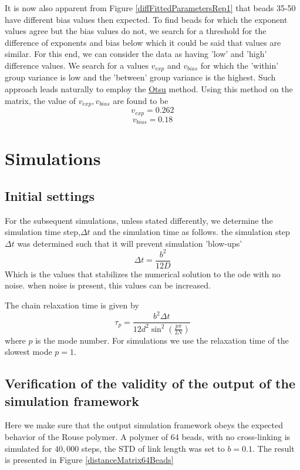 \documentclass[12pt]{paper}
\begin{document}
It is now also apparent from Figure \ref{diffFittedParametersRep1} that beads 35-50 have different bias values then expected. To find beads for which the exponent values agree but the bias values do not, we search for a threshold for the difference of exponents and bias below which it could be said that values are similar. 
For this end, we can consider the data as having 'low' and 'high' difference values. 
We search for a values $v_{exp}$ and $v_{bias}$ for which the 'within' group variance is low and the 'between' group variance is the highest. 
Such approach leads naturally to employ the \href{http://en.wikipedia.org/wiki/Otsu's_method}{Otsu} method. Using this method on the matrix, the value of $v_{exp},v_{bias}$ are found to be 
\begin{equation}
v_{exp}= 0.262
\end{equation}
\begin{equation}
v_{bias}=0.18
\end{equation}

\section{Simulations}
\subsection{Initial settings}
For the subsequent simulations, unless stated differently, we determine the simulation time step,$\Delta t$ and the simulation time as follows. 
the simulation step $\Delta t$  was determined such that it will prevent simulation 'blow-ups'
\begin{equation*}
 \Delta t = \frac{b^2}{12D}
\end{equation*}
Which is the values that stabilizes the numerical solution to the ode with no noise. when noise is present, this values can be increased.

The chain relaxation time is given by 
\begin{equation*}
\tau_p = \frac{b^2\Delta t}{12d^2\sin^2(\frac{p\pi}{2N})}
\end{equation*}
where $p$ is the mode number. For simulations we use the relaxation time of the slowest mode $p=1$.

\subsection{Verification of the validity of the output of the simulation framework}
Here we make sure that the output simulation framework obeys the expected behavior of the Rouse polymer. 
A polymer of 64 beads, with no cross-linking is simulated for $40,000$ steps, the STD of link length was set to $b=0.1$. The result is presented in Figure \ref{distanceMatrix64Beads}
\end{document}
